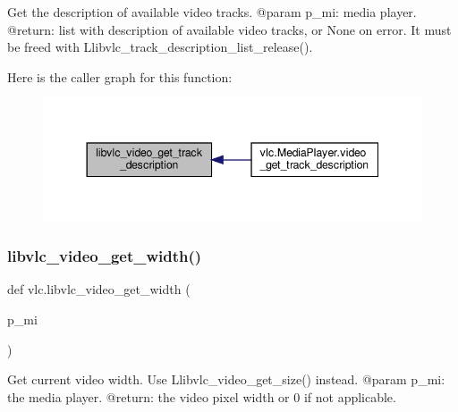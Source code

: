 \begin{DoxyVerb}Get the description of available video tracks.
@param p_mi: media player.
@return: list with description of available video tracks, or None on error. It must be freed with L{libvlc_track_description_list_release}().
\end{DoxyVerb}
 Here is the caller graph for this function\+:
\nopagebreak
\begin{figure}[H]
\begin{center}
\leavevmode
\includegraphics[width=344pt]{namespacevlc_a68edc909fdc25c8f1fc60031778445af_icgraph}
\end{center}
\end{figure}
\mbox{\label{namespacevlc_a8f9436337022e7452520f9d626fe2be4}} 
\subsubsection{\texorpdfstring{libvlc\+\_\+video\+\_\+get\+\_\+width()}{libvlc\_video\_get\_width()}}
{\footnotesize\ttfamily def vlc.\+libvlc\+\_\+video\+\_\+get\+\_\+width (\begin{DoxyParamCaption}\item[{}]{p\+\_\+mi }\end{DoxyParamCaption})}

\begin{DoxyVerb}Get current video width.
\deprecated Use L{libvlc_video_get_size}() instead.
@param p_mi: the media player.
@return: the video pixel width or 0 if not applicable.
\end{DoxyVerb}
 \mbox{\label{namespacevlc_ae66cd567ec307d388c3faa3a303ff70e}} 
